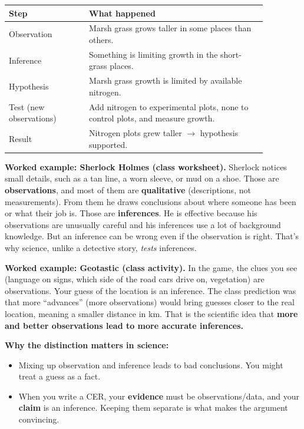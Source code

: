 \documentclass[11pt,letterpaper]{article}
\begin{document}
\begin{longtable}{@{}>{\raggedright\arraybackslash}p{0.27\linewidth}>{\raggedright\arraybackslash}p{0.60\linewidth}@{}}
\toprule
Step & What happened \\
\midrule
\endhead
Observation & Marsh grass grows taller in some places than others. \\
Inference & Something is limiting growth in the short-grass places. \\
Hypothesis & Marsh grass growth is limited by available nitrogen. \\
Test (new observations) & Add nitrogen to experimental plots, none to control plots, and measure growth. \\
Result & Nitrogen plots grew taller $\rightarrow$ hypothesis supported. \\
\bottomrule
\end{longtable}

\textbf{Worked example: Sherlock Holmes (class worksheet).} Sherlock notices small details, such as a tan line, a worn sleeve, or mud on a shoe. Those are \textbf{observations}, and most of them are \textbf{qualitative} (descriptions, not measurements). From them he draws conclusions about where someone has been or what their job is. Those are \textbf{inferences}. He is effective because his observations are unusually careful and his inferences use a lot of background knowledge. But an inference can be wrong even if the observation is right. That's why science, unlike a detective story, \emph{tests} inferences.

\textbf{Worked example: Geotastic (class activity).} In the game, the clues you see (language on signs, which side of the road cars drive on, vegetation) are observations. Your guess of the location is an inference. The class prediction was that more ``advances'' (more observations) would bring guesses closer to the real location, meaning a smaller distance in km. That is the scientific idea that \textbf{more and better observations lead to more accurate inferences.}

\textbf{Why the distinction matters in science:}
\begin{itemize}
  \item Mixing up observation and inference leads to bad conclusions. You might treat a guess as a fact.
  \item When you write a CER, your \textbf{evidence} must be observations/data, and your \textbf{claim} is an inference. Keeping them separate is what makes the argument convincing.
\end{itemize}
\end{document}
